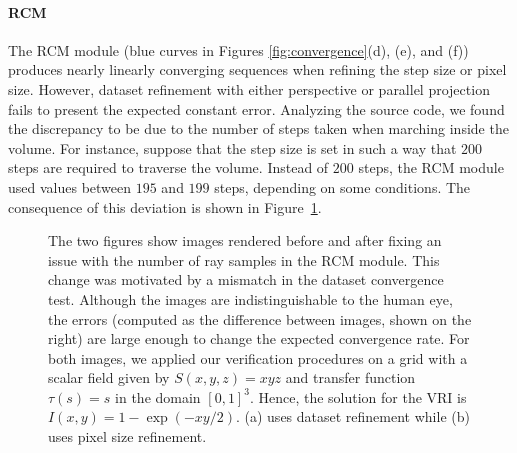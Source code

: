 \paragraph*{RCM}
The RCM module (blue curves in Figures \ref{fig:convergence}(d), (e),
and (f)) produces nearly linearly converging sequences when refining
the step size or pixel size.  However, dataset refinement with either
perspective or parallel projection fails to present the expected
constant error. Analyzing the source code, we found the
discrepancy to be due to the number of steps taken when marching
inside the volume. For instance, suppose that the step size is set in
such a way that $200$ steps are required to traverse the volume. Instead
of $200$ steps, the RCM module used values between $195$ and $199$ steps, depending on
some conditions.  The consequence of this deviation 
is shown in Figure~\ref{fig:problem-example-01}.

\begin{figure}[t]
\centering 
{}
\caption{\label{fig:problem-example-01} The two figures show images
  rendered before and after fixing an issue with the number of ray
  samples in the RCM module. This change was motivated by a mismatch
  in the dataset convergence test. Although the images are
  indistinguishable to the human eye, the errors (computed as the
  difference between images, shown on the right) are large enough to
  change the expected convergence rate. For both images, we applied our
  verification procedures on a grid with a scalar field given by
  $S(x,y,z) = xyz$ and transfer function $\tau(s) = s$ in the domain
  $\left[0,1\right]^3$. Hence, the solution for the VRI is $I(x,y) =
  1-\exp\left( -x y / 2 \right)$. (a) uses dataset refinement while
  (b) uses pixel size refinement.}
\end{figure}


